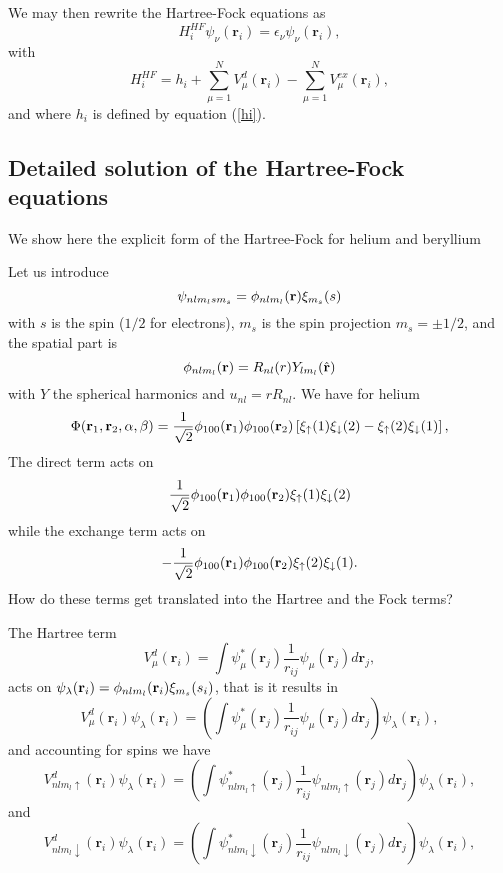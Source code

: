 We may then rewrite the Hartree-Fock equations as
\begin{equation}
  H_i^{HF} \psi_{\nu}(\mathbf{r}_i) = \epsilon_{\nu}\psi_{\nu}(\mathbf{r}_i),
\label{modifiedHF}
\end{equation}
with
\begin{equation}
  H_i^{HF}= h_i + \sum_{\mu=1}^NV_{\mu}^{d}(\mathbf{r}_i) -
  \sum_{\mu=1}^NV_{\mu}^{ex}(\mathbf{r}_i),
\label{HFoperator}
\end{equation}
and where $h_i$ is defined by equation (\ref{hi}). 


\subsection{Detailed solution of  the Hartree-Fock equations}
We show here the explicit form of the Hartree-Fock  for helium and beryllium

Let us introduce 
\[
  \psi_{nlm_lsm_s} = \phi_{nlm_l}({\bf r})\xi_{m_s}(s)
\]
with $s$ is the spin ($1/2$ for electrons), $m_s$ is the spin projection $m_s=\pm 1/2$, and the spatial part is
\[
   \phi_{nlm_l}({\bf r}) =  R_{nl}(r)Y_{lm_l}(\hat{{\bf r}})
\]
with $Y$ the spherical harmonics and $u_{nl} = rR_{nl}$.
We have for helium
\[
\Phi({\bf r}_1,{\bf r}_2,\alpha,\beta)=
\frac{1}{\sqrt{2}}\phi_{100}({\bf r}_1)\phi_{100}({\bf r}_2)\left[
\xi_{\uparrow}(1)\xi_{\downarrow}(2)-\xi_{\uparrow}(2)\xi_{\downarrow}(1)\right],
\]
The direct term acts on
\[
\frac{1}{\sqrt{2}}\phi_{100}({\bf r}_1)\phi_{100}({\bf r}_2)
\xi_{\uparrow}(1)\xi_{\downarrow}(2)
\]
while the exchange term acts on 
\[
-\frac{1}{\sqrt{2}}\phi_{100}({\bf r}_1)\phi_{100}({\bf r}_2)\xi_{\uparrow}(2)\xi_{\downarrow}(1).
\]
How do these terms get translated into the Hartree and the Fock  terms?

The Hartree term
\begin{equation*}
  V_{\mu}^{d}(\mathbf{r}_i) = \int \psi_{\mu}^*(\mathbf{r}_j) 
  \frac{1}{r_{ij}}\psi_{\mu}(\mathbf{r}_j) d\mathbf{r}_j,
\end{equation*}
acts on $\psi_{\lambda}(\mathbf{r}_i)=\phi_{nlm_l}({\bf r}_i)\xi_{m_s}(s_i)$, that is  it results in 
\[
  V_{\mu}^{d}(\mathbf{r}_i)\psi_{\lambda}(\mathbf{r}_i) = \left(\int \psi_{\mu}^*(\mathbf{r}_j) 
  \frac{1}{r_{ij}}\psi_{\mu}(\mathbf{r}_j) d\mathbf{r}_j\right)\psi_{\lambda}(\mathbf{r}_i),
\]
and accounting for spins we have
\[
  V_{nlm_l\uparrow}^{d}(\mathbf{r}_i)\psi_{\lambda}(\mathbf{r}_i) = \left(\int \psi_{nlm_l\uparrow}^*(\mathbf{r}_j) 
  \frac{1}{r_{ij}}\psi_{nlm_l\uparrow}(\mathbf{r}_j) d\mathbf{r}_j\right)\psi_{\lambda}(\mathbf{r}_i),
\]
and 
\[
  V_{nlm_l\downarrow}^{d}(\mathbf{r}_i)\psi_{\lambda}(\mathbf{r}_i) = \left(\int \psi_{nlm_l\downarrow}^*(\mathbf{r}_j) 
  \frac{1}{r_{ij}}\psi_{nlm_l\downarrow}(\mathbf{r}_j) d\mathbf{r}_j\right)\psi_{\lambda}(\mathbf{r}_i),
\]


